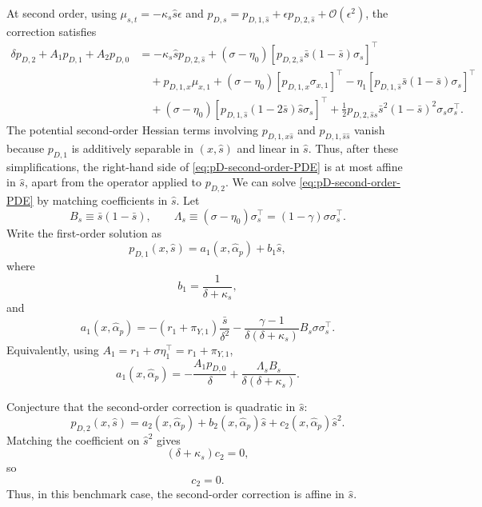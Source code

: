 At second order, using $\mu_{s,t}=-\kappa_s\hat{s}\epsilon$ and $p_{D,s}=p_{D,1,\hat{s}}+\epsilon p_{D,2,\hat{s}}+\mathcal{O}(\epsilon^2)$, the correction satisfies
\begin{align}\label{eq:pD-second-order-PDE}
    \delta p_{D,2}+A_1p_{D,1}+A_2p_{D,0}
    &= -\kappa_s\hat{s}p_{D,2,\hat{s}}
    +(\sigma-\eta_0)\left[p_{D,2,\hat{s}}\bar{s}(1-\bar{s})\sigma_s\right]^\top \nonumber\\
    &\quad +p_{D,1,x}\mu_{x,1}
    +(\sigma-\eta_0)\left[p_{D,1,x}\sigma_{x,1}\right]^\top
    -\eta_1\left[p_{D,1,\hat{s}}\bar{s}(1-\bar{s})\sigma_s\right]^\top \nonumber\\
    &\quad +(\sigma-\eta_0)\left[p_{D,1,\hat{s}}(1-2\bar{s})\hat{s}\sigma_s\right]^\top
    +\frac{1}{2}p_{D,2,\hat{s}\hat{s}}\bar{s}^2(1-\bar{s})^2\sigma_s\sigma_s^\top.
\end{align}
The potential second-order Hessian terms involving $p_{D,1,x\hat{s}}$ and $p_{D,1,\hat{s}\hat{s}}$ vanish because $p_{D,1}$ is additively separable in $(x,\hat{s})$ and linear in $\hat{s}$.
Thus, after these simplifications, the right-hand side of \eqref{eq:pD-second-order-PDE} is at most affine in $\hat{s}$, apart from the operator applied to $p_{D,2}$.
We can solve \eqref{eq:pD-second-order-PDE} by matching coefficients in $\hat{s}$.
Let
\begin{equation}
    B_s \equiv \bar{s}(1-\bar{s}),
    \qquad
    \Lambda_s \equiv (\sigma-\eta_0)\sigma_s^\top=(1-\gamma)\sigma\sigma_s^\top.
\end{equation}
Write the first-order solution as
\begin{equation}
    p_{D,1}(x,\hat{s})=a_1(x,\hat{\alpha}_p)+b_1\hat{s},
\end{equation}
where
\begin{equation}
    b_1=\frac{1}{\delta+\kappa_s},
\end{equation}
and
\begin{equation}
    a_1(x,\hat{\alpha}_p)
    =-(r_1+\pi_{Y,1})\frac{\bar{s}}{\delta^2}
    -\frac{\gamma-1}{\delta(\delta+\kappa_s)}B_s\sigma\sigma_s^\top.
\end{equation}
Equivalently, using $A_1=r_1+\sigma\eta_1^\top=r_1+\pi_{Y,1}$,
\begin{equation}
    a_1(x,\hat{\alpha}_p)
    =-\frac{A_1p_{D,0}}{\delta}+\frac{\Lambda_s B_s}{\delta(\delta+\kappa_s)}.
\end{equation}

Conjecture that the second-order correction is quadratic in $\hat{s}$:
\begin{equation}
    p_{D,2}(x,\hat{s})=a_2(x,\hat{\alpha}_p)+b_2(x,\hat{\alpha}_p)\hat{s}+c_2(x,\hat{\alpha}_p)\hat{s}^2.
\end{equation}
Matching the coefficient on $\hat{s}^2$ gives
\begin{equation}
    (\delta+\kappa_s)c_2=0,
\end{equation}
so
\begin{equation}
    c_2=0.
\end{equation}
Thus, in this benchmark case, the second-order correction is affine in $\hat{s}$.

